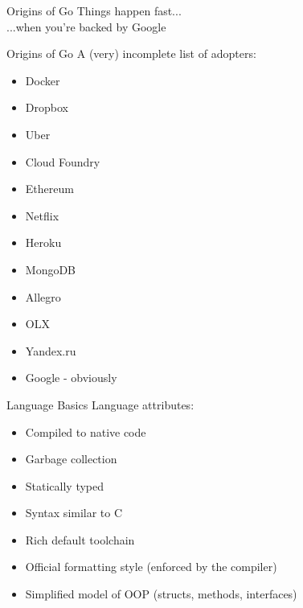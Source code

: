 \documentclass[pdf,xcolor=dvipsnames,noparindent]{beamer}
\begin{document}
\begin{frame}{Origins of Go}
  \pause
  Things happen fast...\\
  \pause
  ...when you're backed by Google
\end{frame}

\begin{frame}{Origins of Go}
  \pause
  A (very) incomplete list of adopters:
  \begin{itemize}
  \item Docker
    \pause
  \item Dropbox
    \pause
  \item Uber
    \pause
  \item Cloud Foundry
    \pause
  \item Ethereum
    \pause
  \item Netflix
    \pause
  \item Heroku
    \pause
  \item MongoDB
    \pause
  \item Allegro
    \pause
  \item OLX
    \pause
  \item Yandex.ru
    \pause
  \item Google - obviously
  \end{itemize}
\end{frame}

\begin{frame}{Language Basics}
  \pause
  Language attributes:
  \begin{itemize}
    \pause
  \item Compiled to native code
    \pause
  \item Garbage collection
    \pause
  \item Statically typed
    \pause
  \item Syntax similar to C
    \pause
  \item Rich default toolchain
    \pause
  \item Official formatting style (enforced by the compiler)
    \pause
  \item Simplified model of OOP (structs, methods, interfaces)
  \end{itemize}
\end{frame}
\end{document}
